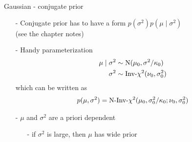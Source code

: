 \documentclass[10pt,handout]{beamer}
\begin{document}








\begin{frame}{Gaussian - conjugate prior}

  \begin{itemize}
  \item[-] Conjugate prior has to have a form
    $p(\sigma^2)p(\mu \mid \sigma^2)$\\
    (see the chapter notes)
    \pause
  \item[-] Handy parameterization
    \begin{align*}
      \mu \mid \sigma^2 & \sim \mathrm{N}(\mu_0,\sigma^2/\kappa_0)\\
      \sigma^2 & \sim \Invchi2(\nu_0,\sigma_0^2)
    \end{align*}
    which can be written as
    \begin{align*}
      p(\mu,\sigma^2)=\NInvchi2(\mu_0,\sigma_0^2/\kappa_0;\nu_0,\sigma_0^2)
    \end{align*}
    \pause
  \item[-] $\mu$ and $\sigma^2$ are a priori dependent
    \begin{itemize}
      \item[-] if $\sigma^2$ is large, then $\mu$ has wide prior
    \end{itemize}
  \end{itemize}

\end{frame}
\end{document}
